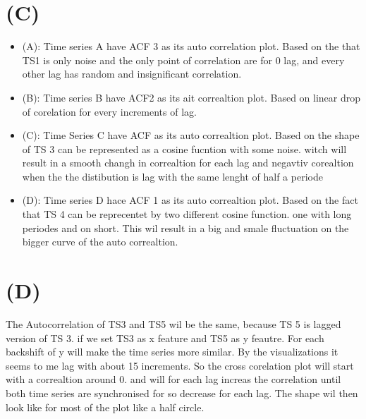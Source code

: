 \documentclass[a4paper]{article}
\begin{document}
\section*{(C)}
\begin{itemize}
    \item (A): Time series A have ACF 3 as its auto correlation plot. Based on the that 
    TS1 is only noise and the only point of correlation are for 0 lag, and every other lag 
    has random and insignificant correlation.
    \item (B): Time series B have ACF2 as its ait correaltion plot. Based on linear drop of corelation for 
    every increments of lag.
    \item (C): Time Series C have ACF as its auto correaltion plot. Based on the shape 
    of TS 3 can be represented as a cosine fucntion with some noise. witch will result in 
    a smooth changh in correaltion for each lag and negavtiv corealtion when the the distibution is 
    lag with the same lenght of half a periode
    \item (D): Time series D hace ACF 1 as its auto correaltion plot. Based on the fact that 
    TS 4 can be reprecentet by two different cosine function. one with long periodes and on short. This wil 
    result in a big and smale fluctuation on the bigger curve of the auto correaltion.
\end{itemize}

\section*{(D)}
The Autocorrelation of TS3 and TS5 wil be the same, because TS 5 is lagged version of 
TS 3. if we set TS3 as x feature and TS5 as y feautre. For each backshift of y will make the time series more similar.
By the visualizations it seems to me lag with about 15 increments. So the cross corelation plot will  start with a correaltion around 0. 
and will for each lag increas the correlation until both time series are synchronised for so decrease for each lag. 
The shape wil then look like for most of the plot like a half circle.
\end{document}
